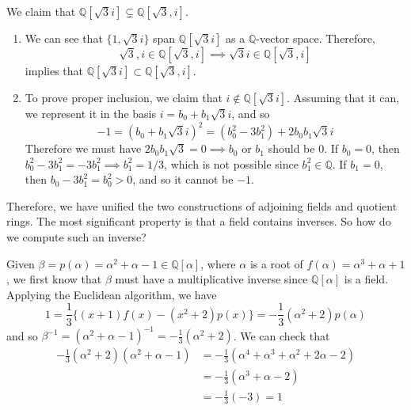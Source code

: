   \begin{example}
    We claim that $\mathbb{Q}[\sqrt{3} i] \subsetneq \mathbb{Q}[\sqrt{3}, i]$. 
    \begin{enumerate}
      \item We can see that $\{1, \sqrt{3}i \}$ span $\mathbb{Q}[\sqrt{3}i ]$ as a $\mathbb{Q}$-vector space. Therefore, 
      \begin{equation}
        \sqrt{3}, i \in \mathbb{Q}[\sqrt{3}, i] \implies \sqrt{3} i \in \mathbb{Q}[\sqrt{3}, i]
      \end{equation} 
      implies that $\mathbb{Q}[\sqrt{3} i] \subset \mathbb{Q}[\sqrt{3}, i]$. 

      \item To prove proper inclusion, we claim that $i \not\in \mathbb{Q}[\sqrt{3}i]$. Assuming that it can, we represent it in the basis $i = b_0 + b_1 \sqrt{3} i$, and so
      \begin{equation}
        -1 = (b_0 + b_1 \sqrt{3} i)^2 = (b_0^2 - 3b_1^2) + 2b_0 b_1 \sqrt{3} i
      \end{equation}
      Therefore we must have $2b_0 b_1 \sqrt{3} = 0 \implies b_0$ or $b_1$ should be $0$. If $b_0 = 0$, then $b_0^2 - 3b_1^2 = -3 b_1^2 \implies b_1^2 = 1/3$, which is not possible since $b_1^2 \in \mathbb{Q}$. If $b_1 = 0$, then $b_0 - 3 b_1^2 = b_0^2 > 0$, and so it cannot be $-1$. 
    \end{enumerate}
  \end{example}

  Therefore, we have unified the two constructions of adjoining fields and quotient rings. The most significant property is that a field contains inverses. So how do we compute such an inverse? 

  \begin{example}
    Given $\beta = p(\alpha) = \alpha^2 + \alpha - 1 \in \mathbb{Q}[\alpha]$, where $\alpha$ is a root of $f(\alpha) = \alpha^3 + \alpha + 1$, we first know that $\beta$ must have a multiplicative inverse since $\mathbb{Q}[\alpha]$ is a field. Applying the Euclidean algorithm, we have 
    \begin{equation}
      1 = \frac{1}{3} \big\{ (x+1) f(x) - (x^2 + 2) p(x)\big\} = -\frac{1}{3} (\alpha^2 + 2) p(\alpha)
    \end{equation}
    and so $\beta^{-1} = (\alpha^2 + \alpha - 1)^{-1} = -\frac{1}{3} (\alpha^2 + 2)$. We can check that 
    \begin{align}
      -\frac{1}{3} (\alpha^2 + 2) (\alpha^2 + \alpha - 1) & = -\frac{1}{3} (\alpha^4 + \alpha^3 + \alpha^2 + 2 \alpha - 2) \\
                                                          & = -\frac{1}{3} (\alpha^3 + \alpha - 2) \\
                                                          & = -\frac{1}{3} (-3) = 1
    \end{align}
  \end{example}

